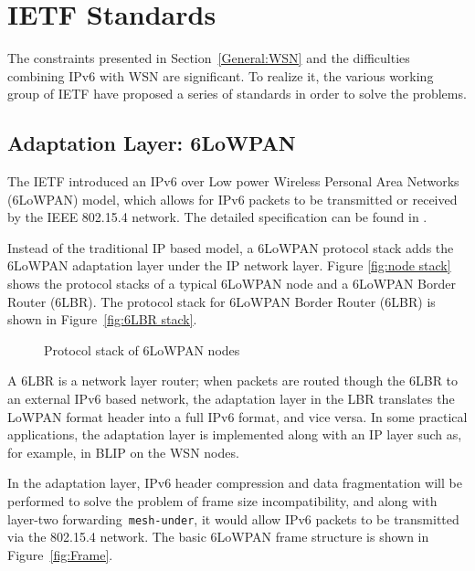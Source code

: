 \chapter{IETF Standards}
\label{IETF}
The constraints presented in Section~\ref{General:WSN} and the difficulties combining IPv6 with WSN are significant. To realize it, the various working group of IETF have proposed a series of standards in order to solve the problems.

\section{Adaptation Layer: 6LoWPAN}
\label{Intr:6LoWPAN}
The IETF introduced an IPv6 over Low power Wireless Personal Area Networks (6LoWPAN) model, which allows for IPv6 packets to be transmitted or received by the IEEE 802.15.4 network. The detailed specification can be found in \cite{RFC 4944}.
\newline

Instead of the traditional IP based model, a 6LoWPAN protocol stack adds the 6LoWPAN adaptation layer under the IP network layer. Figure \ref{fig:node stack} shows the protocol stacks of a typical 6LoWPAN node and a 6LoWPAN Border Router (6LBR)\@. The protocol stack for 6LoWPAN Border Router (6LBR) is shown in Figure~\ref{fig:6LBR stack}.

\begin{figure}[htbp]
  \begin{center}
    \leavevmode
    \caption{Protocol stack of 6LoWPAN nodes}
    \label{fig:protocol stack}
  \end{center}
\end{figure}

A 6LBR is a network layer router; when packets are routed though the 6LBR to an external IPv6 based network, the adaptation layer in the LBR translates the LoWPAN format header into a full IPv6 format, and
vice versa. In some practical applications, the adaptation layer is implemented along with an IP
layer such as, for example, in BLIP on the WSN nodes.
\newline

In the adaptation layer, IPv6 header compression and data fragmentation will be performed to solve the problem of frame size incompatibility, and along with layer-two forwarding~\texttt{mesh-under}, it would allow IPv6 packets to be transmitted via the 802.15.4 network. The basic 6LoWPAN frame structure is shown in Figure~\ref{fig:Frame}.  

